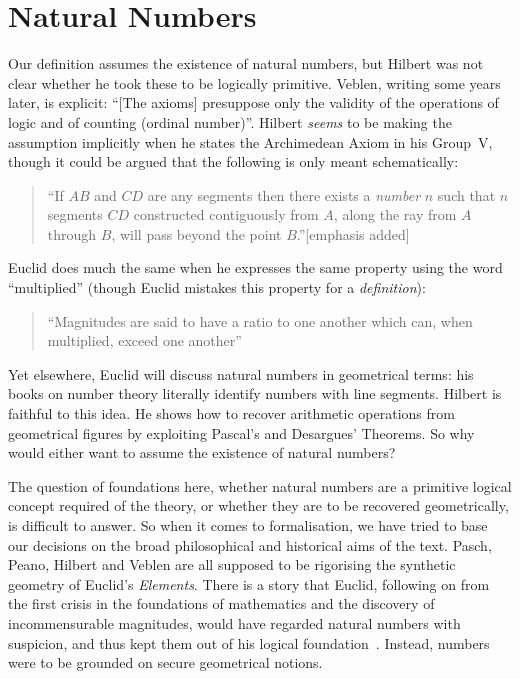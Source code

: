 \section{Natural Numbers}
Our definition assumes the existence of natural numbers, but Hilbert was not clear whether he took these to be logically primitive. Veblen, writing some years later, is explicit: ``[The axioms] presuppose only the validity of the operations of logic and of counting (ordinal number)''. Hilbert \emph{seems} to be making the assumption implicitly when he states the Archimedean Axiom in his Group~V, though it could be argued that the following is only meant schematically:
\begin{quote}
  ``If $AB$ and $CD$ are any segments then there exists a \emph{number} $n$ such that $n$ segments $CD$ constructed contiguously from $A$, along the ray from $A$ through $B$, will pass beyond the point $B$.''[emphasis added]
\end{quote}

Euclid does much the same when he expresses the same property using the word ``multiplied'' (though Euclid mistakes this property for a \emph{definition}):
\begin{quote}
  ``Magnitudes are said to have a ratio to one another which can, when multiplied, exceed one another''
\end{quote}

Yet elsewhere, Euclid will discuss natural numbers in geometrical terms: his books on number theory literally identify numbers with line segments. Hilbert is faithful to this idea. He shows how to recover arithmetic operations from geometrical figures by exploiting Pascal's and Desargues' Theorems. So why would either want to assume the existence of natural numbers?

The question of foundations here, whether natural numbers are a primitive logical concept required of the theory, or whether they are to be recovered geometrically, is difficult to answer. So when it comes to formalisation, we have tried to base our decisions on the broad philosophical and historical aims of the text. Pasch, Peano, Hilbert and Veblen are all supposed to be rigorising the synthetic geometry of Euclid's \emph{Elements}. There is a story that Euclid, following on from the first crisis in the foundations of mathematics and the discovery of incommensurable magnitudes, would have regarded natural numbers with suspicion, and thus kept them out of his logical foundation~\cite{EvolutionEuclideanElements}. Instead, numbers were to be grounded on secure geometrical notions.

